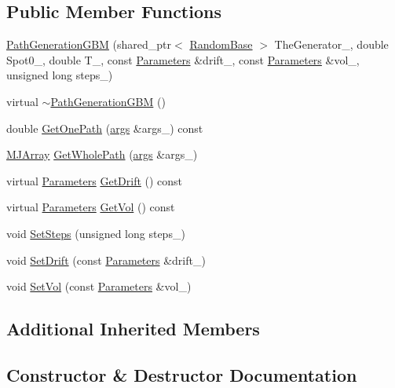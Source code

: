 \subsection*{Public Member Functions}
\begin{DoxyCompactItemize}
\item 
\hyperlink{classPathGenerationGBM_aba41021bb84202742fea8e69e8d09c86}{Path\+Generation\+G\+BM} (shared\+\_\+ptr$<$ \hyperlink{classRandomBase}{Random\+Base} $>$ The\+Generator\+\_\+, double Spot0\+\_\+, double T\+\_\+, const \hyperlink{classParameters}{Parameters} \&drift\+\_\+, const \hyperlink{classParameters}{Parameters} \&vol\+\_\+, unsigned long steps\+\_)
\item 
virtual \hyperlink{classPathGenerationGBM_a9e6f1c4803d020420dbffdb3b1107a02}{$\sim$\+Path\+Generation\+G\+BM} ()
\item 
double \hyperlink{classPathGenerationGBM_ac8bbe44a4ec2fd4a2249086d912dff33}{Get\+One\+Path} (\hyperlink{path__generation_8h_a75c13cde2074f502cc4348c70528572d}{args} \&args\+\_\+) const
\item 
\hyperlink{classMJArray}{M\+J\+Array} \hyperlink{classPathGenerationGBM_abcf6790de9e9b4deef334653409a5c3f}{Get\+Whole\+Path} (\hyperlink{path__generation_8h_a75c13cde2074f502cc4348c70528572d}{args} \&args\+\_\+)
\item 
virtual \hyperlink{classParameters}{Parameters} \hyperlink{classPathGenerationGBM_afd14338fefddbe66fa7328e33a9ab60b}{Get\+Drift} () const
\item 
virtual \hyperlink{classParameters}{Parameters} \hyperlink{classPathGenerationGBM_a9c4387dfc5f0d024f5d112996546c0c7}{Get\+Vol} () const
\item 
void \hyperlink{classPathGenerationGBM_ad6e5900646658170c9491b2897c3a4bf}{Set\+Steps} (unsigned long steps\+\_\+)
\item 
void \hyperlink{classPathGenerationGBM_a67aa2511f5cc9d90b81ab97730248e09}{Set\+Drift} (const \hyperlink{classParameters}{Parameters} \&drift\+\_\+)
\item 
void \hyperlink{classPathGenerationGBM_af1212fa64fcb9a97be42b4482ff51b65}{Set\+Vol} (const \hyperlink{classParameters}{Parameters} \&vol\+\_\+)
\end{DoxyCompactItemize}
\subsection*{Additional Inherited Members}


\subsection{Constructor \& Destructor Documentation}
\hypertarget{classPathGenerationGBM_aba41021bb84202742fea8e69e8d09c86}{}\label{classPathGenerationGBM_aba41021bb84202742fea8e69e8d09c86} 
